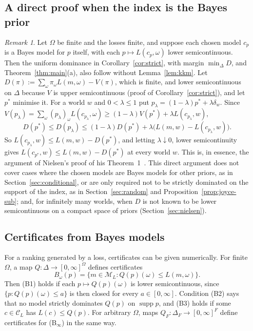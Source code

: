 \documentclass[11pt]{article}
\theoremstyle{definition}
\theoremstyle{remark}
\newtheorem{remark}[theorem]{Remark}
\newcommand{\M}{\mathcal M}
\newcommand{\C}{\mathcal C}
\newcommand{\supp}{\operatorname{supp}}
\begin{document}
\subsection{A direct proof when the index is the Bayes prior}\label{sec:direct}
\begin{remark}\label{rem:direct}
Let $\Omega$ be finite and the losses finite, and suppose each chosen model $c_p$ is a Bayes model for $p$ itself, with each $p\mapsto L(c_p,\omega)$ lower semicontinuous. Then the uniform dominance in Corollary~\ref{cor:strict}, with margin $\min_\Delta D$, and Theorem~\ref{thm:main}(a), also follow without Lemma~\ref{lem:kkm}. Let $D(\pi):=\sum_\omega\pi_\omega L(m,\omega)-V(\pi)$, which is finite, and lower semicontinuous on $\Delta$ because $V$ is upper semicontinuous (proof of Corollary~\ref{cor:strict}), and let $p^*$ minimise it. For a world $w$ and $0<\lambda\le1$ put $p_\lambda=(1-\lambda)p^*+\lambda\delta_w$. Since $V(p_\lambda)=\sum_\omega(p_\lambda)_\omega L(c_{p_\lambda},\omega)\ge(1-\lambda)V(p^*)+\lambda L(c_{p_\lambda},w)$,
\[
 D(p^*)\le D(p_\lambda)\le(1-\lambda)D(p^*)+\lambda\bigl(L(m,w)-L(c_{p_\lambda},w)\bigr).
\]
So $L(c_{p_\lambda},w)\le L(m,w)-D(p^*)$, and letting $\lambda\downarrow0$, lower semicontinuity gives $L(c_{p^*},w)\le L(m,w)-D(p^*)$ at every world $w$. This is, in essence, the argument of Nielsen's proof of his Theorem~1~\cite[Appendix~C]{Nielsen}. This direct argument does not cover cases where the chosen models are Bayes models for other priors, as in Section~\ref{sec:conditional}, or are only required not to be strictly dominated on the support of the index, as in Section~\ref{sec:random} and Proposition~\ref{prop:joyce-sub}; and, for infinitely many worlds, when $D$ is not known to be lower semicontinuous on a compact space of priors (Section~\ref{sec:nielsen}).
\end{remark}

\subsection{Certificates from Bayes models}\label{sec:bayesbounds}
For a ranking generated by a loss, certificates can be given numerically. For finite $\Omega$, a map $Q:\Delta\to[0,\infty]^\Omega$ defines certificates
\[
 B_\omega(p)=\{m\in\M_L:Q(p)(\omega)\le L(m,\omega)\}.
\]
Then (B1) holds if each $p\mapsto Q(p)(\omega)$ is lower semicontinuous, since $\{p:Q(p)(\omega)\le a\}$ is then closed for every $a\in[0,\infty]$. Condition (B2) says that no model strictly dominates $Q(p)$ on $\supp p$, and (B3) holds if some $c\in\C_L$ has $L(c)\le Q(p)$. For arbitrary $\Omega$, maps $Q_F:\Delta_F\to[0,\infty]^F$ define certificates for (B$_\infty$) in the same way.
\end{document}
